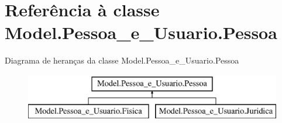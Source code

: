 \hypertarget{class_model_1_1_pessoa__e___usuario_1_1_pessoa}{}\section{Referência à classe Model.\+Pessoa\+\_\+e\+\_\+\+Usuario.\+Pessoa}
\label{class_model_1_1_pessoa__e___usuario_1_1_pessoa}
Diagrama de heranças da classe Model.\+Pessoa\+\_\+e\+\_\+\+Usuario.\+Pessoa\begin{figure}[H]
\begin{center}
\leavevmode
\includegraphics[height=2.000000cm]{class_model_1_1_pessoa__e___usuario_1_1_pessoa}
\end{center}
\end{figure}
